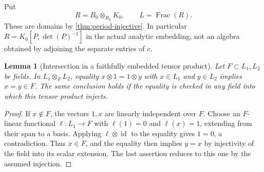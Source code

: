 \documentclass[11pt]{article}
\numberwithin{equation}{section}
\newtheorem{lemma}[lemma]{Lemma}
\theoremstyle{definition}
\theoremstyle{remark}
\newcommand{\Frac}{\operatorname{Frac}}
\newcommand{\id}{\operatorname{id}}
\begin{document}
Put
\[
 R=B_0\otimes_{R_0}K_0,\qquad L=\Frac(R).
\]
These are domains by \cref{thm:period-injective}. In particular
$R=K_0[P,\det(P)^{-1}]$ in the actual analytic embedding, not an algebra
obtained by adjoining the separate entries of $c$.

\begin{lemma}[Intersection in a faithfully embedded tensor product]\label{lem:intersection}
Let $F\subset L_1,L_2$ be fields. In $L_1\otimes_F L_2$, equality
$x\otimes1=1\otimes y$ with $x\in L_1$ and $y\in L_2$ implies
$x=y\in F$. The same conclusion holds if the equality is checked in any
field into which this tensor product injects.
\end{lemma}
\begin{proof}
If $x\notin F$, the vectors $1,x$ are linearly independent over $F$.
Choose an $F$-linear functional $\ell:L_1\to F$ with
$\ell(1)=0$ and $\ell(x)=1$, extending from their span to a basis.
Applying $\ell\otimes\id$ to the equality gives $1=0$, a contradiction.
Thus $x\in F$, and the equality then implies $y=x$ by injectivity of the
field into its scalar extension. The last assertion reduces to this one
by the assumed injection.
\end{proof}
\end{document}
